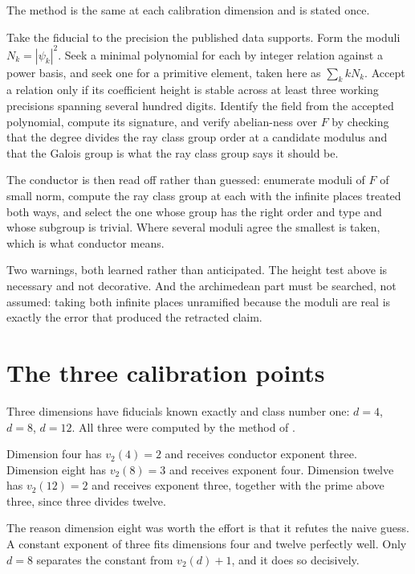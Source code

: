\documentclass[12pt,a4paper]{article}
\newcommand{\Fd}{F}
\begin{document}
The method is the same at each calibration dimension and is stated once.

Take the fiducial to the precision the published data supports. Form the moduli
$N_k = |\psi_k|^2$. Seek a minimal polynomial for each by integer relation
against a power basis, and seek one for a primitive element, taken here as
$\sum_k k N_k$. Accept a relation only if its coefficient height is stable
across at least three working precisions spanning several hundred digits.
Identify the field from the accepted polynomial, compute its signature, and
verify abelian-ness over $\Fd$ by checking that the degree divides the ray class
group order at a candidate modulus and that the Galois group is what the ray
class group says it should be.

The conductor is then read off rather than guessed: enumerate moduli of $\Fd$ of
small norm, compute the ray class group at each with the infinite places treated
both ways, and select the one whose group has the right order and type and whose
subgroup is trivial. Where several moduli agree the smallest is taken, which is
what conductor means.

Two warnings, both learned rather than anticipated. The height test above is
necessary and not decorative. And the archimedean part must be searched, not
assumed: taking both infinite places unramified because the moduli are real is
exactly the error that produced the retracted claim.

\section{The three calibration points}
\label{sec:calibration}

Three dimensions have fiducials known exactly and class number one: $d=4$,
$d=8$, $d=12$. All three were computed by the method of .

Dimension four has $v_2(4) = 2$ and receives conductor exponent three.
Dimension eight has $v_2(8) = 3$ and receives exponent four. Dimension twelve
has $v_2(12) = 2$ and receives exponent three, together with the prime above
three, since three divides twelve.

The reason dimension eight was worth the effort is that it refutes the naive
guess. A constant exponent of three fits dimensions four and twelve perfectly
well. Only $d=8$ separates the constant from $v_2(d)+1$, and it does so
decisively.
\end{document}
